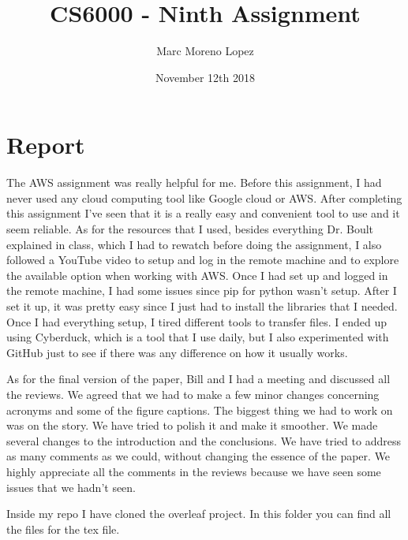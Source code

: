 \documentclass{article}
\title{CS6000 - Ninth Assignment}
\author{Marc Moreno Lopez}
\date{November 12th 2018}
\begin{document}
\maketitle

\section{Report}


The AWS assignment was really helpful for me. Before this assignment, I had never used any cloud computing tool like Google cloud or AWS. After completing this assignment I've seen that it is a really easy and convenient tool to use and it seem reliable. As for the resources that I used, besides everything Dr. Boult explained in class, which I had to rewatch before doing the assignment, I also followed a YouTube video to setup and log in the remote machine and to explore the available option when working with AWS. Once I had set up and logged in the remote machine, I had some issues since pip for python wasn't setup. After I set it up, it was pretty easy since I just had to install the libraries that I needed. Once I had everything setup, I tired different tools to transfer files. I ended up using Cyberduck, which is a tool that I use daily, but I also experimented with GitHub just to see if there was any difference on how it usually works. 

As for the final version of the paper, Bill and I had a meeting and discussed all the reviews. We agreed that we had to make a few minor changes concerning acronyms and some of the figure captions. The biggest thing we had to work on was on the story. We have tried to polish it and make it smoother. We made several changes to the introduction and the conclusions. We have tried to address as many comments as we could, without changing the essence of the paper. We highly appreciate all the comments in the reviews because we have seen some issues that we hadn't seen. 

Inside my repo I have cloned the overleaf project. In this folder you can find all the files for the tex file.
\end{document}
